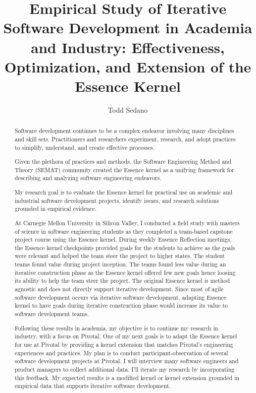 \documentclass[preprint,12pt,3p]{elsarticle}
\begin{document}
\begin{frontmatter}

\title{Empirical Study of Iterative Software Development in Academia and Industry: Effectiveness, Optimization, and Extension of the Essence Kernel}

\author{Todd Sedano}


\address{Carnegie Mellon University}
\address{Silicon Valley Campus}
\address{Moffett Field, CA 94035, USA}


\begin{abstract}
Software development continues to be a complex endeavor involving many disciplines and skill sets. Practitioners and researchers experiment, research, and adopt practices to simplify, understand, and create effective processes. 

Given the plethora of practices and methods, the Software Engineering Method and Theory (SEMAT) community created the Essence kernel as a unifying framework for describing and analyzing software engineering endeavors. 

My research goal is to evaluate the Essence kernel for practical use on academic and industrial software development projects, identify issues, and research solutions grounded in empirical evidence. 

At Carnegie Mellon University in Silicon Valley, I conducted a field study with masters of science in software engineering students as they completed a team-based capstone project course using the Essence kernel. During weekly Essence Reflection meetings, the Essence kernel checkpoints provided goals for the students to achieve as the goals were relevant and helped the team steer the project to higher states. The student teams found value during project inception. The teams found less value during an iterative construction phase as the Essence kernel offered few new goals hence loosing its ability to help the team steer the project. The original Essence kernel is method agnostic and does not directly support iterative development. Since most of agile software development occurs via iterative software development, adapting Essence kernel to have goals during iterative construction phase would increase its value to software development teams.

Following these results in academia, my objective is to continue my research in industry, with a focus on Pivotal. One of my next goals is to adapt the Essence kernel for use at Pivotal by providing a kernel extension that matches Pivotal's engineering experiences and practices. My plan is to conduct participant-observation of several software development projects at Pivotal. I will interview many software engineers and product managers to collect additional data. I'll iterate my research by incorporating this feedback. My expected results is a modified kernel or kernel extension grounded in empirical data that supports iterative software development. 


\end{abstract}
\end{frontmatter}
\end{document}
